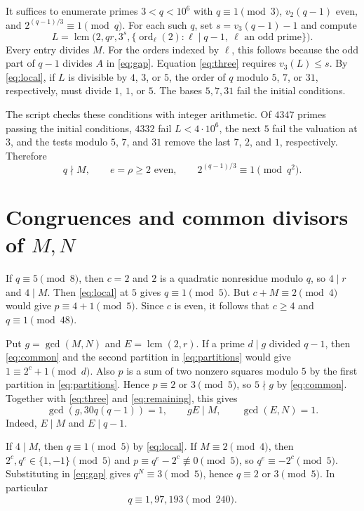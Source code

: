 \documentclass[11pt]{article}
\DeclareMathOperator{\ord}{ord}
\DeclareMathOperator{\lcm}{lcm}
\begin{document}
It suffices to enumerate primes $3<q<10^6$ with
$q\equiv1\pmod3$, $v_2(q-1)$ even, and $2^{(q-1)/3}\equiv1\pmod q$.
For each such $q$, set $s=v_3(q-1)-1$ and compute
\[
L=\lcm\bigl(2,qr,3^s,
  \{\ord_\ell(2):\ell\mid q-1,\ \ell\text{ an odd prime}\}\bigr).
\]
Every entry divides $M$. For the orders indexed by $\ell$, this follows
because the odd part of $q-1$ divides $A$ in \eqref{eq:gap}.
Equation \eqref{eq:three} requires $v_3(L)\le s$. By \eqref{eq:local},
if $L$ is divisible by $4$, $3$, or $5$, the order of $q$ modulo $5$,
$7$, or $31$, respectively, must divide $1$, $1$, or $5$.
The bases $5,7,31$ fail the initial conditions.

The script  checks these
conditions with integer arithmetic. Of $4347$ primes passing the
initial conditions, $4332$ fail $L<4\cdot10^6$, the next $5$ fail the
valuation at $3$, and the tests modulo $5$, $7$, and $31$ remove the
last $7$, $2$, and $1$, respectively. Therefore
\begin{equation}\label{eq:remaining}
q\nmid M,\qquad e=\rho\ge2\text{ even},\qquad
2^{(q-1)/3}\equiv1\pmod{q^2}.
\end{equation}

\section{Congruences and common divisors of \texorpdfstring{$M,N$}{M,N}}
\label{sec:gcd}

If $q\equiv5\pmod8$, then $c=2$ and $2$ is a quadratic nonresidue
modulo $q$, so $4\mid r$ and $4\mid M$. Then \eqref{eq:local} at $5$
gives $q\equiv1\pmod5$. But $c+M\equiv2\pmod4$ would give
$p\equiv4+1\pmod5$. Since $c$ is even, it follows that $c\ge4$ and
$q\equiv1\pmod{48}$.

Put $g=\gcd(M,N)$ and $E=\lcm(2,r)$. If a prime $d\mid g$ divided
$q-1$, then \eqref{eq:common} and the second partition in
\eqref{eq:partitions} would give $1\equiv2^c+1\pmod d$.
Also $p$ is a sum of two nonzero squares modulo $5$ by the first
partition in \eqref{eq:partitions}. Hence $p\equiv2$ or
$3\pmod5$, so $5\nmid g$ by \eqref{eq:common}.
Together with \eqref{eq:three} and \eqref{eq:remaining}, this gives
\begin{equation}\label{eq:gcd}
\gcd(g,30q(q-1))=1,\qquad gE\mid M,\qquad \gcd(E,N)=1.
\end{equation}
Indeed, $E\mid M$ and $E\mid q-1$.

If $4\mid M$, then $q\equiv1\pmod5$ by \eqref{eq:local}.
If $M\equiv2\pmod4$, then $2^c,q^e\in\{1,-1\}\pmod5$ and
$p\equiv q^e-2^c\not\equiv0\pmod5$, so $q^e\equiv-2^c\pmod5$.
Substituting in \eqref{eq:gap} gives $q^N\equiv3\pmod5$, hence
$q\equiv2$ or $3\pmod5$. In particular
\begin{equation}\label{eq:240}
q\equiv1,97,193\pmod{240}.
\end{equation}
\end{document}
